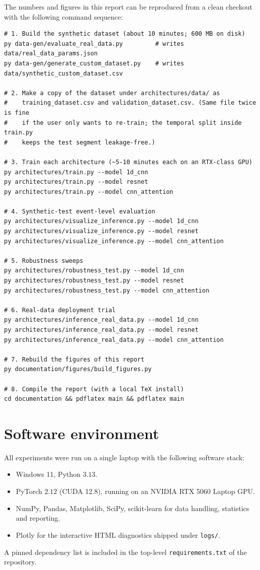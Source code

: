 The numbers and figures in this report can be reproduced from a clean
checkout with the following command sequence:

\begin{lstlisting}[basicstyle=\ttfamily\footnotesize]
# 1. Build the synthetic dataset (about 10 minutes; 600 MB on disk)
py data-gen/evaluate_real_data.py         # writes data/real_data_params.json
py data-gen/generate_custom_dataset.py    # writes data/synthetic_custom_dataset.csv

# 2. Make a copy of the dataset under architectures/data/ as
#    training_dataset.csv and validation_dataset.csv. (Same file twice is fine
#    if the user only wants to re-train; the temporal split inside train.py
#    keeps the test segment leakage-free.)

# 3. Train each architecture (~5-10 minutes each on an RTX-class GPU)
py architectures/train.py --model 1d_cnn
py architectures/train.py --model resnet
py architectures/train.py --model cnn_attention

# 4. Synthetic-test event-level evaluation
py architectures/visualize_inference.py --model 1d_cnn
py architectures/visualize_inference.py --model resnet
py architectures/visualize_inference.py --model cnn_attention

# 5. Robustness sweeps
py architectures/robustness_test.py --model 1d_cnn
py architectures/robustness_test.py --model resnet
py architectures/robustness_test.py --model cnn_attention

# 6. Real-data deployment trial
py architectures/inference_real_data.py --model 1d_cnn
py architectures/inference_real_data.py --model resnet
py architectures/inference_real_data.py --model cnn_attention

# 7. Rebuild the figures of this report
py documentation/figures/build_figures.py

# 8. Compile the report (with a local TeX install)
cd documentation && pdflatex main && pdflatex main
\end{lstlisting}

\section{Software environment}
\label{app:env}

All experiments were run on a single laptop with the following
software stack:
\begin{itemize}[leftmargin=*, itemsep=0.2em]
    \item Windows 11, Python $3.13$.
    \item PyTorch $2.12$ (CUDA 12.8), running on an NVIDIA RTX 5060
    Laptop GPU.
    \item NumPy, Pandas, Matplotlib, SciPy, scikit-learn for data
    handling, statistics and reporting.
    \item Plotly for the interactive HTML diagnostics shipped under
    \texttt{logs/}.
\end{itemize}
A pinned dependency list is included in the top-level
\texttt{requirements.txt} of the repository.
